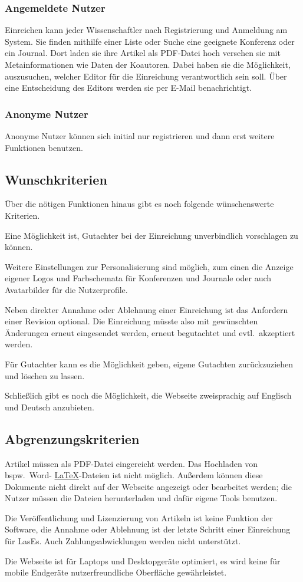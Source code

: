 \subsubsection{Angemeldete Nutzer}\label{mkrit:angemeldet}
Einreichen kann jeder Wissenschaftler nach Registrierung und Anmeldung am System.
Sie finden mithilfe einer Liste oder Suche eine geeignete Konferenz oder ein Journal.
Dort laden sie ihre Artikel als PDF-Datei hoch versehen sie mit Metainformationen wie Daten der Koautoren.
Dabei haben sie die Möglichkeit, auszusuchen, welcher Editor für die Einreichung verantwortlich sein soll.
Über eine Entscheidung des Editors werden sie per E-Mail benachrichtigt.

\subsubsection{Anonyme Nutzer}\label{mkrit:anon}
Anonyme Nutzer können sich initial nur registrieren und dann erst weitere Funktionen benutzen.


\subsection{Wunschkriterien}

Über die nötigen Funktionen hinaus gibt es noch folgende wünschenswerte Kriterien.

Eine Möglichkeit ist, Gutachter bei der Einreichung unverbindlich vorschlagen zu können.

Weitere Einstellungen zur Personalisierung sind möglich,
zum einen die Anzeige eigener Logos und Farbschemata für Konferenzen und Journale oder auch Avatarbilder für die Nutzerprofile.

Neben direkter Annahme oder Ablehnung einer Einreichung ist das Anfordern einer Revision optional.
Die Einreichung müsste also mit gewünschten Änderungen erneut eingesendet werden, erneut begutachtet und evtl.\ akzeptiert werden.

Für Gutachter kann es die Möglichkeit geben, eigene Gutachten zurückzuziehen und löschen zu lassen.

Schließlich gibt es noch die Möglichkeit, die Webseite zweisprachig auf Englisch und Deutsch anzubieten.

\subsection{Abgrenzungskriterien}

Artikel müssen als PDF-Datei eingereicht werden. Das Hochladen von bspw.\ Word- \hyperref[glo:latex]{\LaTeX}-Dateien ist nicht möglich.
Außerdem können diese Dokumente nicht direkt auf der Webseite angezeigt oder bearbeitet werden;
die Nutzer müssen die Dateien herunterladen und dafür eigene Tools benutzen.

Die Veröffentlichung und Lizenzierung von Artikeln ist keine Funktion der Software,
die Annahme oder Ablehnung ist der letzte Schritt einer Einreichung für LasEs.
Auch Zahlungsabwicklungen werden nicht unterstützt.

Die Webseite ist für Laptops und Desktopgeräte optimiert, es wird keine für mobile Endgeräte nutzerfreundliche Oberfläche gewährleistet.
